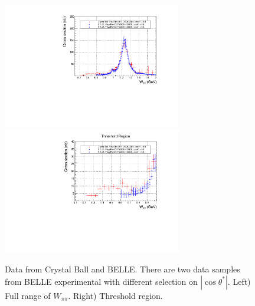 \begin{figure}[tbh]
\begin{center}
\includegraphics[height=5.5cm,angle=0]{figures/HEPData-ins815978-v1-Table_31_c2.pdf}
\includegraphics[height=5.5cm,angle=0]{figures/HEPData-ins815978-v1-Table_31_c1.pdf}
\end{center}
\caption{Data from Crystal Ball and BELLE. There are two data samples from BELLE experimental with different selection on $|\cos{\theta^*}|$. Left) Full range of $W_{\pi\pi}$. Right) Threshold region.
\label{fig:CrystalBall_BELLE_data}}
\end{figure}



